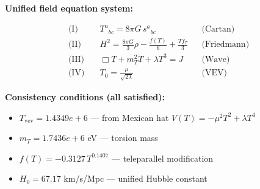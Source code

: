 
\textbf{Unified field equation system:}

\begin{align}
  \text{(I)} \quad & T^a{}_{bc} = 8\pi G \, s^a{}_{bc} && \text{(Cartan)} \\
  \text{(II)} \quad & H^2 = \frac{8\pi G}{3}\rho - \frac{f(T)}{6} + \frac{Tf_T}{3} && \text{(Friedmann)} \\
  \text{(III)} \quad & \Box T + m_T^2 T + \lambda T^3 = J && \text{(Wave)} \\
  \text{(IV)} \quad & T_0 = \frac{\mu}{\sqrt{2\lambda}} && \text{(VEV)}
\end{align}

\textbf{Consistency conditions (all satisfied):}
\begin{itemize}
  \item $T_{\text{vev}} = 1.4349e+6$ — from Mexican hat $V(T) = -\mu^2 T^2 + \lambda T^4$
  \item $m_T = 1.7436e+6$ eV — torsion mass
  \item $f(T) = -0.3127 \, T^{0.1407}$ — teleparallel modification
  \item $H_0 = 67.17$ km/s/Mpc — unified Hubble constant
\end{itemize}